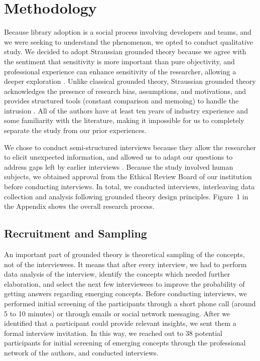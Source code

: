 \section{Methodology}


Because library adoption is a social process involving developers and teams, and we were seeking to understand the phenomenon, we opted to conduct qualitative study. We decided to adopt Straussian grounded theory because we agree with the sentiment that sensitivity is more important than pure objectivity, and professional experience can enhance sensitivity of the researcher, allowing a deeper exploration \cite{corbin2014gt}. Unlike classical grounded theory, Straussian grounded theory acknowledges the presence of research bias, assumptions, and motivations, and provides structured tools (constant comparison and memoing) to handle the intrusion \cite{stol2016grounded,corbin2014gt}. All of the authors have at least ten years of industry experience and some familiarity with the literature, making it impossible for us to completely separate the study from our prior experiences. 

We chose to conduct semi-structured interviews because they allow the researcher to elicit unexpected information, and allowed us to adapt our questions to address gaps left by earlier interviews \cite{HoveAnda,Seaman}. Because the study involved human subjects, we obtained approval from the Ethical Review Board of our institution before conducting interviews. In total, we conducted \numInterviews interviews, interleaving data collection and analysis following grounded theory design principles. Figure~1 in the Appendix shows the overall research process.




\subsection{Recruitment and Sampling}

 An important part of grounded theory is theoretical sampling of the concepts, not of the interviewees. It means that after every interview, we had to perform data analysis of the interview, identify the concepts which needed further elaboration, and select the next few interviewees to improve the probability of getting answers regarding emerging concepts. Before conducting interviews, we performed initial screening of the participants through a short phone call (around 5 to 10 minutes) or through emails or social network messaging. After we identified that a participant could provide relevant insights, we sent them a formal interview invitation. In this way, we reached out to 38 potential participants for initial screening of emerging concepts through the professional network of the authors, and conducted \numInterviews interviews. 

